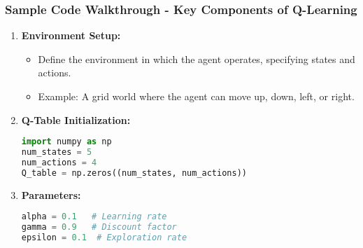\documentclass[aspectratio=169]{beamer}
\begin{document}
\begin{frame}[fragile]
    \frametitle{Sample Code Walkthrough - Key Components of Q-Learning}
    \begin{enumerate}
        \item \textbf{Environment Setup:}
        \begin{itemize}
            \item Define the environment in which the agent operates, specifying states and actions.
            \item Example: A grid world where the agent can move up, down, left, or right.
        \end{itemize}
        \item \textbf{Q-Table Initialization:}
        \begin{lstlisting}[language=Python]
import numpy as np
num_states = 5
num_actions = 4
Q_table = np.zeros((num_states, num_actions))
        \end{lstlisting}
        \item \textbf{Parameters:}
        \begin{lstlisting}[language=Python]
alpha = 0.1   # Learning rate
gamma = 0.9   # Discount factor
epsilon = 0.1  # Exploration rate
        \end{lstlisting}
    \end{enumerate}
\end{frame}
\end{document}
